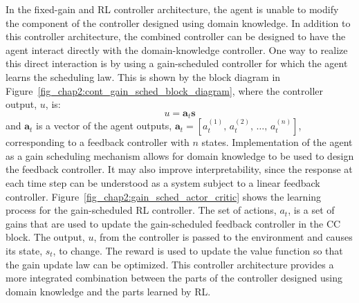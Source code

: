 In the fixed-gain and RL controller architecture, the agent is unable to modify the component of the controller designed using domain knowledge.
In addition to this controller architecture,
the combined controller can be designed to have the agent interact directly with the domain-knowledge controller. One way to realize this direct interaction is by using a gain-scheduled controller for which the agent learns the scheduling law. This is shown by the block diagram in Figure~\ref{fig_chap2:cont_gain_sched_block_diagram}, where the controller output, $u$, is:
%
\begin{equation}
u = \boldsymbol{a}_t\boldsymbol{s}
\label{eq_chap2:cont_gain_sched_RL_block_diagram}
\end{equation}
%
and $\boldsymbol{a}_t$ is a vector of the agent outputs, $\boldsymbol{a}_t=[a_t^{(1)}, \, a_t^{(2)}, \, \dots, \, a_t^{(n)}]$, corresponding to a feedback controller with $n$ states.
Implementation of the agent as a gain scheduling mechanism allows for domain knowledge to be used to design the feedback controller.
It may also improve interpretability, since the response at each time step can be understood as a system subject to a linear feedback controller.
%
Figure~\ref{fig_chap2:gain_sched_actor_critic} shows the learning process for the gain-scheduled RL controller.
%
The set of actions, $a_t$, is a set of gains that are used to update the gain-scheduled feedback controller in the CC block. The output, $u$, from the controller is passed to the environment and causes its state, $s_t$, to change. The reward is used to update the value function so that the gain update law can be optimized. This controller architecture provides a more integrated combination between the parts of the controller designed using domain knowledge and the parts learned by RL.
%
